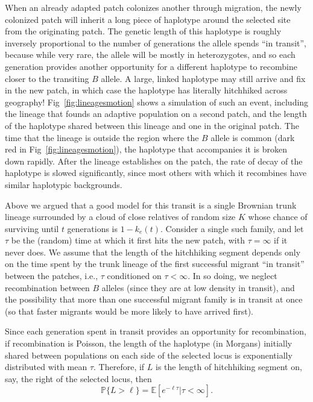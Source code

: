 \documentclass[10pt,letterpaper]{article}
\renewcommand{\P}{\mathbb{P}}
\newcommand{\E}{\mathbb{E}}
\begin{document}
When an already adapted patch colonizes another through migration,
 the newly colonized patch will inherit a long piece of haplotype around the selected site from the originating patch.
The genetic length of this haplotype is roughly inversely proportional to the
number of generations the allele spends ``in transit'', 
because while very rare, the allele will be mostly in heterozygotes,
and so each generation provides another opportunity for a different haplotype to recombine closer to the transiting $B$ allele.
A large, linked haplotype may still arrive and fix in the new patch,
in which case the haplotype has literally hitchhiked across geography!
Fig~\ref{fig:lineagesmotion} shows a simulation of such an event,
including the lineage that founds an adaptive population on a second patch,
and the length of the haplotype shared between this lineage and one in the original patch.
The time that the lineage is outside the region where the $B$ allele is common (dark red in Fig~\ref{fig:lineagesmotion}), 
the haplotype that accompanies it is broken down rapidly. 
After the lineage establishes on the patch, the rate of decay of the haplotype is slowed significantly, 
since most others with which it recombines have similar haplotypic backgrounds. 


Above we argued that a good model for this transit is a single Brownian trunk lineage
surrounded by a cloud of close relatives of random size $K$
whose chance of surviving until $t$ generations is $1-k_e(t)$.
Consider a single such family, and let $\tau$ be the (random) time at which it first hits the new patch,
with $\tau = \infty$ if it never does. 
We assume that the length of the hitchhiking segment depends only on 
the time spent by the trunk lineage of the first successful migrant ``in transit'' between the patches,
i.e., $\tau$ conditioned on $\tau < \infty$.
In so doing, we neglect 
recombination between $B$ alleles (since they are at low density in transit),
and the possibility that more than one successful migrant family is in transit at once
(so that faster migrants would be more likely to have arrived first).

Since each generation spent in transit provides an opportunity for recombination,
if recombination is Poisson, the length of the haplotype (in Morgans)
initially shared between populations on each side of the selected locus is exponentially distributed
with mean $\tau$. 
Therefore, if $L$ is the length of hitchhiking segment on, say, the right of
the selected locus, then
\begin{equation} \label{eqn:haplen_cdf2}
\P\{L>\ell\} = \E[e^{-\ell \tau}|\tau<\infty] .
\end{equation}
\end{document}
